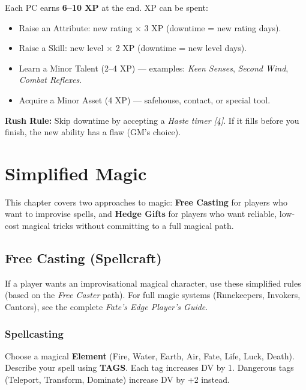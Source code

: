\documentclass[11pt]{book}
\begin{document}
Each PC earns \textbf{6--10 XP} at the end. XP can be spent:

\begin{itemize}
  \item Raise an Attribute: new rating $\times$ 3 XP (downtime = new rating days).
  \item Raise a Skill: new level $\times$ 2 XP (downtime = new level days).
  \item Learn a Minor Talent (2--4 XP) --- examples: \textit{Keen Senses}, \textit{Second Wind}, \textit{Combat Reflexes}.
  \item Acquire a Minor Asset (4 XP) --- safehouse, contact, or special tool.
\end{itemize}

\textbf{Rush Rule:} Skip downtime by accepting a \textit{Haste timer [4]}. If it fills before you finish, the new ability has a flaw (GM's choice).

\clearpage

\chapter{Simplified Magic}
\label{ch:simplified-magic}

This chapter covers two approaches to magic: \textbf{Free Casting} for players who want to improvise spells, and \textbf{Hedge Gifts} for players who want reliable, low-cost magical tricks without committing to a full magical path.

\section{Free Casting (Spellcraft)}

If a player wants an improvisational magical character, use these simplified rules (based on the \textit{Free Caster} path). For full magic systems (Runekeepers, Invokers, Cantors), see the complete \textit{Fate's Edge Player's Guide}.

\subsection*{Spellcasting}

Choose a magical \textbf{Element} (Fire, Water, Earth, Air, Fate, Life, Luck, Death). Describe your spell using \textbf{TAGS}. Each tag increases DV by 1. Dangerous tags (Teleport, Transform, Dominate) increase DV by +2 instead.
\end{document}
